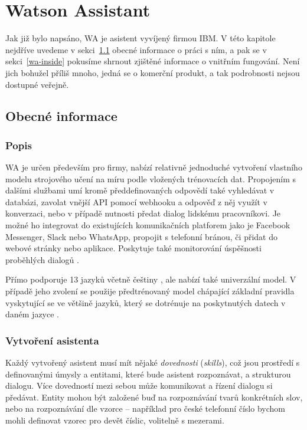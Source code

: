 \chapter{Watson Assistant}

Jak již bylo napsáno, WA je asistent vyvíjený firmou IBM.
V této kapitole nejdříve uvedeme v sekci~\ref{wa-common} obecné informace
o práci s ním, a pak se v sekci~\ref{wa-inside} pokusíme shrnout zjištěné
informace o vnitřním fungování.
Není jich bohužel příliš mnoho, jedná se o komerční produkt,
a tak podrobnosti nejsou dostupné veřejně.

\section{Obecné informace}\label{wa-common}

\subsection{Popis}

WA je určen především pro firmy, nabízí relativně jednoduché vytvoření
vlastního modelu strojového učení na míru podle vložených trénovacích
dat. Propojením s dalšími službami umí kromě předdefinovaných odpovědí
také vyhledávat v databázi, zavolat vnější API pomocí webhooku a odpověď
z něj využít v konverzaci, nebo v případě nutnosti předat dialog lidskému
pracovníkovi. Je možné ho integrovat do existujících komunikačních platforem
jako je Facebook Messenger, Slack nebo WhatsApp, propojit s telefonní
bránou, či přidat do webové stránky nebo aplikace. Poskytuje také monitorování
úspěšnosti proběhlých dialogů \citep{wa_about}.

Přímo podporuje 13 jazyků včetně
češtiny \citep{wa_languages}, ale nabízí také univerzální model. V případě
jeho zvolení se použije předtrénovaný model chápající základní pravidla
vyskytující se ve většině jazyků, který se dotrénuje na poskytnutých
datech v daném jazyce \citep{wa_universal_model}.

\subsection{Vytvoření asistenta}

Každý vytvořený asistent musí mít nějaké \textit{dovednosti} (\textit{skills}),
což jsou prostředí s definovanými úmysly a entitami, které bude asistent
rozpoznávat, a strukturou dialogu. Více dovedností mezi sebou může komunikovat
a řízení dialogu si předávat. Entity mohou být založené buď na rozpoznávání tvarů
konkrétních slov, nebo na rozpoznávání dle vzorce -- například pro české telefonní
číslo bychom mohli definovat vzorec pro devět číslic, volitelně s mezerami.

